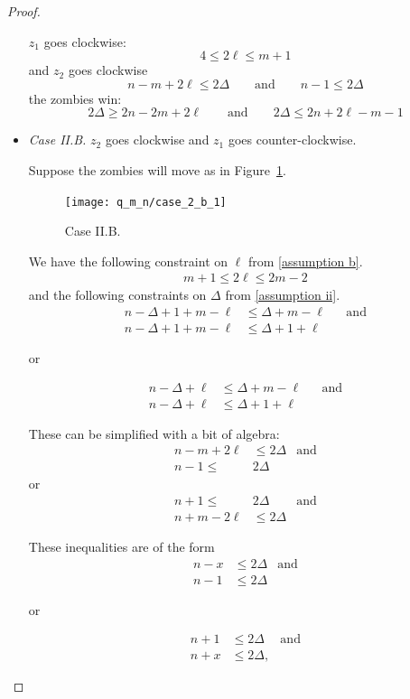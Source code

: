 \begin{proof}
\begin{proofpart}
\begin{itemize}
  $z_1$ goes clockwise:
  \[ 4 \leq 2 \ell \leq m + 1 \]
  and $z_2$ goes clockwise
  \[ n -m + 2\ell \leq 2 \Delta \qquad \text{and} \qquad n-1 \leq 2 \Delta \]
  the zombies win:
  \[ 2 \Delta \geq 2n - 2m + 2\ell \qquad \text{and} \qquad 2 \Delta \leq 2n + 2\ell - m - 1\]


  \item \textit{Case II.B.} $z_2$ goes clockwise and $z_1$ goes counter-clockwise.

  Suppose the zombies will move as in Figure~\ref{fig:case_2_b_1}.
  \begin{figure}
    \centering
    \texttt{[image: q\_m\_n/case\_2\_b\_1]}
    \caption{Case II.B. \label{fig:case_2_b_1}}
  \end{figure}

  We have the following constraint on $\ell$ from \ref{assumption b}.
  \begin{align*}
   m + 1 \leq 2 \ell \leq 2m - 2
  \end{align*}
  and the following constraints on $\Delta$ from \ref{assumption ii}.
  \begin{align*}
   n - \Delta + 1 + m - \ell &\leq \Delta + m - \ell && \text{and} \\
   n - \Delta + 1 + m - \ell &\leq \Delta + 1 + \ell
  \end{align*}
  \begin{center}or\end{center}
    \begin{align*}
     n - \Delta + \ell &\leq \Delta + m - \ell && \text{and} \\
     n - \Delta + \ell &\leq \Delta + 1 + \ell
    \end{align*}

  These can be simplified with a bit of algebra:
  \begin{align*}
   n-m+2\ell &\leq 2 \Delta & \text{and} \\
   n-1 \leq       & 2\Delta
  \end{align*}
  or
  \begin{align*}
   n+1 \leq        & 2 \Delta & \text{and} \\
   n+m-2\ell  &\leq 2 \Delta
  \end{align*}

  These inequalities are of the form
  \begin{align*}
   n-x &\leq 2 \Delta & \text{and} \\
   n-1 &\leq 2\Delta
  \end{align*}
  \begin{center}or\end{center}
  \begin{align*}
   n + 1 &\leq 2 \Delta & \text{and} \\
   n + x &\leq 2 \Delta,
  \end{align*}


\end{itemize}
\end{proofpart}
\end{proof}

